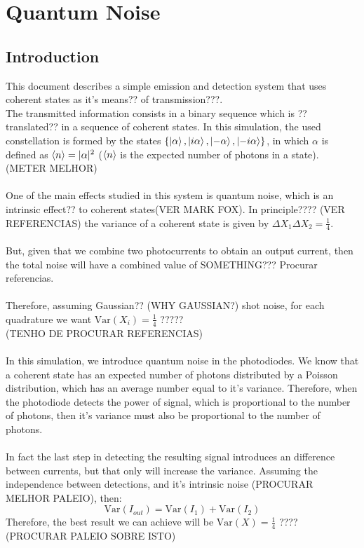 \clearpage
\section{Quantum Noise}

\subsection*{Introduction}\label{sec:intro}

This document describes a simple emission and detection system that uses coherent states as it's means?? of transmission???.\\
The transmitted information consists in a binary sequence which is ??translated?? in a sequence of coherent states. In this simulation, the used constellation is formed by the states $\{ \ket{\alpha}, \ket{i\alpha}, \ket{ - \alpha}, \ket{ - i \alpha} \}$, in which $\alpha$ is defined as $\braket{n} = |\alpha|^2$ ($\braket{n}$ is the expected number of photons in a state). (METER MELHOR) \\
\\
One of the main effects studied in this system is quantum noise, which is an intrinsic effect?? to coherent states(VER MARK FOX). In principle???? (VER REFERENCIAS) the variance of a coherent state is given by $\Delta X_1 \Delta X_2 = \frac{1}{4}$.\\
\\
But, given that we combine two photocurrents to obtain an output current, then the total noise will have a combined value of SOMETHING??? Procurar referencias.\\
\\
Therefore, assuming Gaussian?? (WHY GAUSSIAN?) shot noise, for each quadrature we want $\textrm{Var}(X_i) = \frac{1}{4}$ ?????\\
(TENHO DE PROCURAR REFERENCIAS)
\\
\\
In this simulation, we introduce quantum noise in the photodiodes.
We know that a coherent state has an expected number of photons distributed by a Poisson distribution, which has an average number equal to it's variance. Therefore, when the photodiode detects the power of signal, which is proportional to the number of photons, then it's variance must also be proportional to the number of photons.\\
\\
In fact the last step in detecting the resulting signal introduces an difference between currents, but that only will increase the variance. Assuming the independence between detections, and it's intrinsic noise (PROCURAR MELHOR PALEIO), then:
$$
\textrm{Var}(I_{out}) = \textrm{Var}(I_1) + \textrm{Var}(I_2)
$$
Therefore, the best result we can achieve will be $\textrm{Var}(X) = \frac{1}{4}$ ???? (PROCURAR PALEIO SOBRE ISTO)\\
\\
\\
